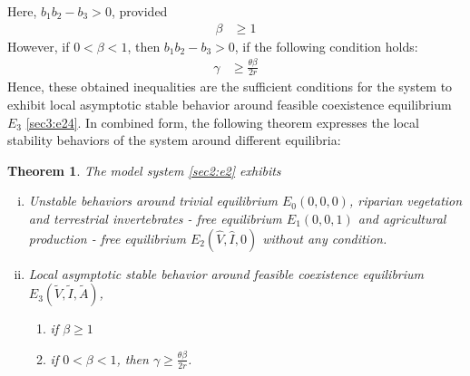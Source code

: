 \documentclass[12pt]{article}
\newtheorem{theorem}{Theorem}[section]
\numberwithin{equation}{section}
\begin{document}
Here, $b_1b_2-b_3>0$, provided
\begin{align}\label{sec3:e36}
\beta &\geq 1
\end{align} 
However, if $0< \beta <1$, then $b_1b_2-b_3>0$, if the following condition holds:
\begin{align}\label{sec3:e36a}
\gamma &\geq \frac{\theta \beta}{2r}
\end{align} 
Hence, these obtained inequalities are the sufficient conditions for the system to exhibit local asymptotic stable behavior around feasible coexistence equilibrium $E_3$ \eqref{sec3:e24}.
In combined form, the following theorem expresses the local stability behaviors of the system around different equilibria:
\begin{theorem}\label{Theorem 3.4}
The model system \eqref{sec2:e2} exhibits
\begin{enumerate}[i)]
\item Unstable behaviors around trivial equilibrium $E_0(0,0,0)$, riparian vegetation and terrestrial invertebrates - free equilibrium $E_1(0,0,1)$ and agricultural production - free equilibrium $E_2(\hat V,\hat I,0)$ without any condition.
\item Local asymptotic stable behavior around feasible coexistence equilibrium $E_3(\tilde V,\tilde I,\tilde A)$, 
\begin{enumerate}
\item[a).] if $\beta\geq 1$
\item[b).] if $0<\beta<1$, then $\gamma \geq \frac{\theta \beta}{2r}$.
\end{enumerate}
\end{enumerate}
 \end{theorem}
\end{document}

